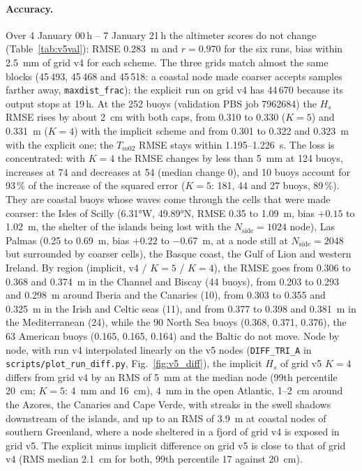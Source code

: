 \documentclass[11pt,a4paper]{article}
\newcommand{\nside}{N_{\mathrm{side}}}
\begin{document}
\paragraph{Accuracy.} Over 4 January 00\,h -- 7 January 21\,h the
altimeter scores do not change (Table~\ref{tab:v5val}): RMSE \SI{0.283}{m}
and $r=0.970$ for the six runs, bias within \SI{2.5}{mm} of grid v4 for
each scheme. The three grids match almost the same blocks (45\,493,
45\,468 and 45\,518: a coastal node made coarser accepts samples farther
away, \texttt{maxdist\_frac}); the explicit run on grid v4 has 44\,670
because its output stops at 19\,h. At the 252 buoys (validation PBS job 7962684) the $H_s$ RMSE
rises by about \SI{2}{cm} with both caps, from 0.310 to 0.330 ($K=5$) and
\SI{0.331}{m} ($K=4$) with the implicit scheme and from 0.301 to 0.322 and
\SI{0.323}{m} with the explicit one; the $T_{m02}$ RMSE stays within
1.195--\SI{1.226}{s}. The loss is concentrated: with $K=4$ the RMSE
changes by less than \SI{5}{mm} at 124 buoys, increases at 74 and
decreases at 54 (median change 0), and 10 buoys account for 93\,\% of the
increase of the squared error ($K=5$: 181, 44 and 27 buoys, 89\,\%). They
are coastal buoys whose waves come through the cells that were made
coarser: the Isles of Scilly (\ang{6.31}W, \ang{49.89}N, RMSE 0.35 to
\SI{1.09}{m}, bias $+0.15$ to \SI{+1.02}{m}, the shelter of the islands
being lost with the $\nside=1024$ node), Las Palmas (0.25 to
\SI{0.69}{m}, bias $+0.22$ to \SI{-0.67}{m}, at a node still at
$\nside=2048$ but surrounded by coarser cells), the Basque coast, the
Gulf of Lion and western Ireland. By region (implicit, v4 / $K=5$ /
$K=4$), the RMSE goes from 0.306 to 0.368 and \SI{0.374}{m} in the Channel
and Biscay (44 buoys), from 0.203 to 0.293 and \SI{0.298}{m} around Iberia
and the Canaries (10), from 0.303 to 0.355 and \SI{0.325}{m} in the Irish
and Celtic seas (11), and from 0.377 to 0.398 and \SI{0.381}{m} in the
Mediterranean (24), while the 90 North Sea buoys (0.368, 0.371, 0.376),
the 63 American buoys (0.165, 0.165, 0.164) and the Baltic do not move.
Node by node, with run v4 interpolated linearly on the v5 nodes
(\texttt{DIFF\_TRI\_A} in \texttt{scripts/plot\_run\_diff.py},
Fig.~\ref{fig:v5_diff}), the implicit $H_s$ of grid v5 $K=4$ differs from
grid v4 by an RMS of \SI{5}{mm} at the median node (99th percentile
\SI{20}{cm}; $K=5$: 4~mm and \SI{16}{cm}), \SI{4}{mm} in the open
Atlantic, 1--\SI{2}{cm} around the Azores, the Canaries and Cape Verde,
with streaks in the swell shadows downstream of the islands, and up to an
RMS of \SI{3.9}{m} at coastal nodes of southern Greenland, where a node
sheltered in a fjord of grid v4 is exposed in grid v5. The explicit minus
implicit difference on grid v5 is close to that of grid v4 (RMS median
\SI{2.1}{cm} for both, 99th percentile 17 against \SI{20}{cm}).
\end{document}
